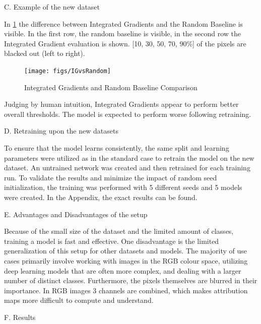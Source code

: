 C. Example of the new dataset

In \ref{fig:IGvsRandom} the difference between Integrated Gradients and the Random Baseline is visible. In the first row, the random baseline is visible, in the second row the Integrated Gradient evaluation is shown. [10, 30, 50, 70, 90\%] of the pixels are blacked out (left to right).

\begin{figure}[h!]
	\centering
	\texttt{[image: figs/IGvsRandom]}
	\caption{Integrated Gradients and Random Baseline Comparison}
	\label{fig:IGvsRandom}
\end{figure}

Judging by human intuition, Integrated Gradients appear to perform better overall thresholds. The model is expected to perform worse following retraining.

D. Retraining upon the new datasets

To ensure that the model learns consistently, the same split and learning parameters were utilized as in the standard case to retrain the model on the new dataset. An untrained network was created and then retrained for each training run. To validate the results and minimize the impact of random seed initialization, the training was performed with 5 different seeds and 5 models were created. In the Appendix, the exact results can be found.

E. Advantages and Disadvantages of the setup

Because of the small size of the dataset and the limited amount of classes, training a model is fast and effective. One disadvantage is the limited generalization of this setup for other datasets and models. The majority of use cases primarily involve working with images in the RGB colour space, utilizing deep learning models that are often more complex, and dealing with a larger number of distinct classes. Furthermore, the pixels themselves are blurred in their importance. In RGB images 3 channels are combined, which makes attribution maps more difficult to compute and understand.

F. Results

